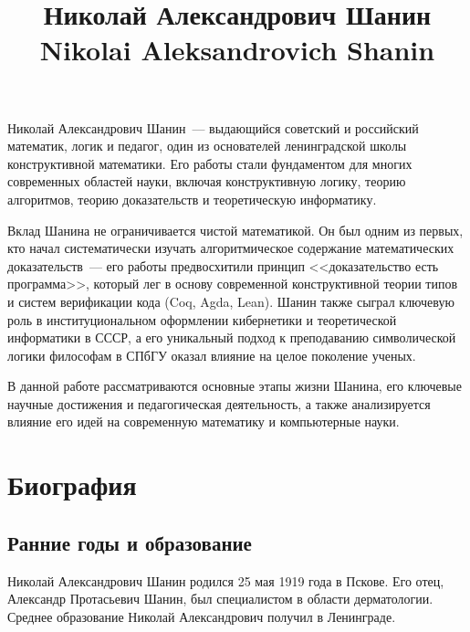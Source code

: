 \documentclass[essay,paper]{pmk-graduate}
\begin{document}

\subject{История и методология математики и информатики}




\title{Николай Александрович Шанин
\english Nikolai Aleksandrovich Shanin}

\maketitlepage

\introduction
Николай Александрович Шанин~--- выдающийся советский и российский математик, логик и педагог, один из основателей ленинградской школы конструктивной математики. Его работы стали фундаментом для многих современных областей науки, включая конструктивную логику, теорию алгоритмов, теорию доказательств и теоретическую информатику.

Вклад Шанина не ограничивается чистой математикой. Он был одним из первых, кто начал систематически изучать алгоритмическое содержание математических доказательств~--- его работы предвосхитили принцип <<доказательство есть программа>>, который лег в основу современной конструктивной теории типов и систем верификации кода (Coq, Agda, Lean). Шанин также сыграл ключевую роль в институциональном оформлении кибернетики и теоретической информатики в СССР, а его уникальный подход к преподаванию символической логики философам в СПбГУ оказал влияние на целое поколение ученых.

В данной работе рассматриваются основные этапы жизни Шанина, его ключевые научные достижения и педагогическая деятельность, а также анализируется влияние его идей на современную математику и компьютерные науки.

\section{Биография}

\subsection{Ранние годы и образование}

Николай Александрович Шанин родился 25 мая 1919 года в Пскове. Его отец, Александр Протасьевич Шанин, был специалистом в области дерматологии. Среднее образование Николай Александрович получил в Ленинграде.
\end{document}
